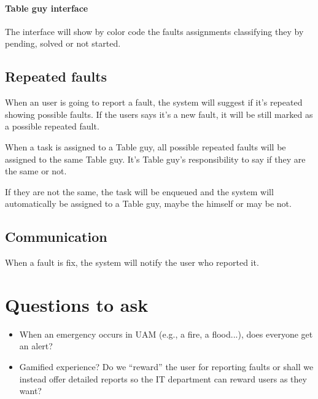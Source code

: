 \documentclass{article}
\newcommand{\tbg}{Table guy\xspace}
\begin{document}
\paragraph{\tbg interface}
The interface will show by color code the faults assignments classifying  they by pending, solved or not started.


\subsection{Repeated faults}
When an user is going to report a fault, the system will suggest if it's repeated showing possible faults. If the users says it's a new fault, it will be still marked as a possible repeated fault.

When a task is assigned to a \tbg, all possible repeated faults will be assigned to the same \tbg. It's \tbg's responsibility to say if they are the same or not.

If they are not the same, the task will be enqueued and the system will automatically be assigned to a \tbg, maybe the himself or may be not.


\subsection{Communication}

When a fault is fix, the system will notify the user who reported it.

\section{Questions to ask}

\begin{itemize}
\item When an emergency occurs in UAM (e.g., a fire, a flood...), does everyone get an alert?
\item Gamified experience? Do we ``reward'' the user for reporting faults or shall we instead offer detailed reports so the IT department can reward users as they want?

\end{itemize}
\end{document}
